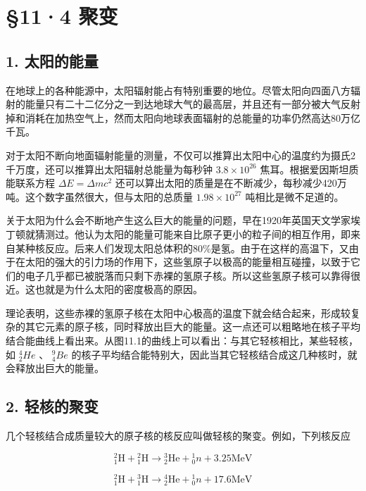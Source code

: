 \section{§11·4 聚变}

\subsection{1. 太阳的能量}

在地球上的各种能源中，太阳辐射能占有特别重要的地位。尽管太阳向四面八方辐射的能量只有二十二亿分之一到达地球大气的最高层，并且还有一部分被大气反射掉和消耗在加热空气上，然而太阳向地球表面辐射的总能量的功率仍然高达80万亿千瓦。

对于太阳不断向地面辐射能量的测量，不仅可以推算出太阳中心的温度约为摄氏2千万度，还可以推算出太阳辐射总能量为每秒钟
\(3.8\times10^{26}\) 焦耳。根据爱因斯坦质能联系方程
\(\Delta E=\Delta mc^{2}\)
还可以算出太阳的质量是在不断减少，每秒减少420万吨。这个数字虽然很大，但与太阳的总质量
\(1.98\times10^{27}\) 吨相比是微不足道的。

关于太阳为什么会不断地产生这么巨大的能量的问题，早在1920年英国天文学家埃丁顿就猜测过。他认为太阳的能量可能来自比原子更小的粒子间的相互作用，即来自某种核反应。后来人们发现太阳总体积的80\%是氢。由于在这样的高温下，又由于在太阳的强大的引力场的作用下，这些氢原子以极高的能量相互碰撞，以致于它们的电子几乎都已被脱落而只剩下赤裸的氢原子核。所以这些氢原子核可以靠得很近。这也就是为什么太阳的密度极高的原因。

理论表明，这些赤裸的氢原子核在太阳中心极高的温度下就会结合起来，形成较复杂的其它元素的原子核，同时释放出巨大的能量。这一点还可以粗略地在核子平均结合能曲线上看出来。从图11.1的曲线上可以看出：与其它轻核相比，某些轻核，如
\(^{4}_{2}He\) 、 \(^{9}_{4}Be\)
的核子平均结合能特别大，因此当其它轻核结合成这几种核时，就会释放出巨大的能量。

\subsection{2. 轻核的聚变}

几个轻核结合成质量较大的原子核的核反应叫做轻核的聚变。例如，下列核反应

\[
{ } _ { 1 } ^ { 2 } \mathrm{H} + { } _ { 1 } ^ { 2 } \mathrm{H} \longrightarrow { } _ { 2 } ^ { 3 } \mathrm{He} + { } _ { 0 } ^ { 1 } n + 3.25 \mathrm{MeV}
\]

\[
{ } _ {1}^{2}\mathrm{H}+{ } _ {1}^{3}\mathrm{H}\longrightarrow { } _ {2}^{4}\mathrm{He}+{ } _ {0}^{1}n+17.6\mathrm{MeV}
\]

